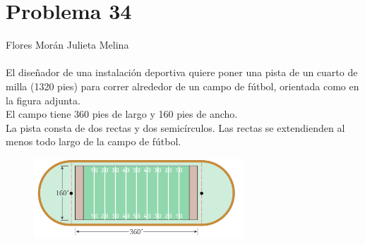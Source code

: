 \documentclass[12pt]{article}
\begin{document}
\section{Problema 34}
Flores Morán Julieta Melina\\
\\
El diseñador de una instalación deportiva quiere poner una pista de un cuarto de milla (1320 pies) para correr alrededor de un campo de fútbol, orientada como en la figura adjunta. \\

El campo tiene 360 pies de largo y 160 pies de ancho.\\

La pista consta de dos rectas y dos semicírculos. Las rectas  se extendienden al menos todo largo de la campo de fútbol.
\begin{figure}[h]
\centering
\includegraphics[width=0.7\textwidth]{img/fut.png}
\end{figure}
\end{document}
